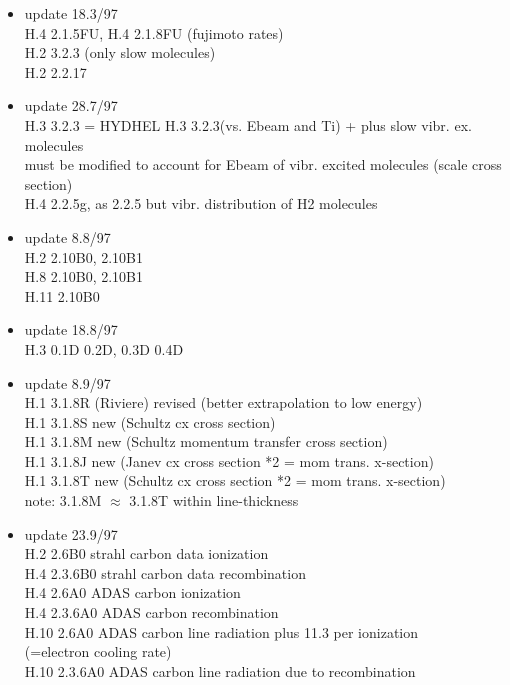 \documentclass[12pt,dvips]{article}
\begin{document}
\begin{itemize}
   Corona H-ionization rate from SOLXY: out, because:
   wrong, and never used anyway
(i.e. H.8 2.1.5G out).
 \item update   18.3/97 \\
  H.4 2.1.5FU, H.4 2.1.8FU (fujimoto rates) \\
  H.2 3.2.3  (only slow molecules) \\
  H.2 2.2.17
 \item update   28.7/97 \\
  H.3 3.2.3  = HYDHEL H.3 3.2.3(vs. Ebeam and Ti) + plus
  slow vibr. ex. molecules\\
  must be modified to account for Ebeam of vibr. excited
  molecules (scale cross section)\\
  H.4 2.2.5g, as 2.2.5 but vibr. distribution of H2 molecules
 \item update    8.8/97 \\
  H.2 2.10B0, 2.10B1 \\
  H.8 2.10B0, 2.10B1 \\
  H.11 2.10B0
 \item update   18.8/97 \\
  H.3 0.1D  0.2D, 0.3D 0.4D \\
 \item update    8.9/97 \\
  H.1 3.1.8R (Riviere) revised (better extrapolation to low energy) \\
  H.1 3.1.8S new (Schultz cx cross section) \\
  H.1 3.1.8M new (Schultz momentum transfer cross section) \\
  H.1 3.1.8J new (Janev cx cross section *2 = mom trans. x-section)\\
  H.1 3.1.8T new (Schultz cx cross section *2 = mom trans. x-section)\\
  note: 3.1.8M $\approx$ 3.1.8T within line-thickness
 \item update   23.9/97 \\
  H.2 2.6B0 strahl carbon data ionization\\
  H.4 2.3.6B0 strahl carbon data recombination \\
  H.4 2.6A0 ADAS  carbon ionization    \\
  H.4 2.3.6A0 ADAS  carbon recombination \\
  H.10 2.6A0 ADAS  carbon line radiation plus 11.3 per ionization\\
                   (=electron cooling rate)\\
  H.10 2.3.6A0 ADAS  carbon line radiation due to recombination\\

\end{itemize}
\end{document}
